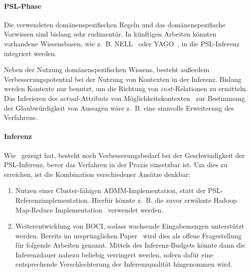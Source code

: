 \paragraph{PSL-Phase}
Die verwendeten domänenspezifischen Regeln und das domänenspezifische Vorwissen sind bislang sehr rudimentär.
In künftigen Arbeiten könnten vorhandene Wissensbasen, wie z.~B. NELL~\cite{Carlson2010} oder YAGO~\cite{YAGO}, in die PSL-Inferenz integriert werden.

Neben der Nutzung domänenspezifischen Wissens, besteht außerdem Verbesserungspotential bei der Nutzung von Kontexten in der Inferenz.
Bislang werden Kontexte nur benutzt, um die Richtung von $inst$-Relationen zu ermitteln.
Das Inferieren des $actual$-Attributs von Möglichkeitskontexten~ zur Bestimmung der Glaubwürdigkeit von Aussagen wäre z.~B. eine sinnvolle Erweiterung des Verfahrens.

\paragraph{Inferenz}
Wie~ gezeigt hat, besteht noch Verbesserungsbedarf bei der Geschwindigkeit der PSL-Inferenz, bevor das Verfahren in der Praxis einsetzbar ist.
Um dies zu erreichen, ist die Kombination verschiedener Ansätze denkbar:
\begin{enumerate}
	\item Nutzen einer Cluster-fähigen ADMM-Implementation, statt der PSL-Referenz\-implementation.
		Hierfür könnte z.~B. die zuvor erwähnte Hadoop Map-Reduce Implementation~\cite{Lubell-Doughtie2013} verwendet werden.
	\item Weiterentwicklung von BOCI, sodass wachsende Eingabemengen unterstützt werden.
		Bereits im ursprünglichen Paper~\cite[Abschnitt 6]{Pujara2015} wird dies als offene Fragestellung für folgende Arbeiten genannt.
		Mittels des Inferenz-Budgets könnte dann die Inferenzdauer nahezu beliebig verringert werden, sofern dafür eine entsprechende Verschlechterung der Inferenzqualität hingenommen wird.
\end{enumerate}
